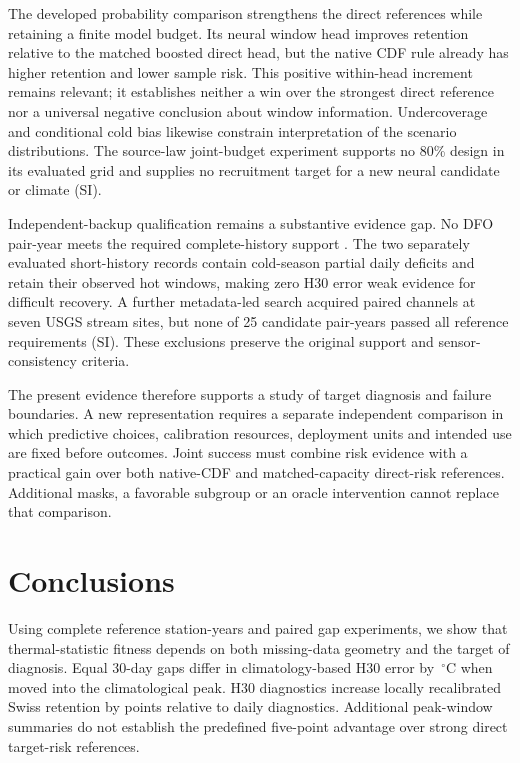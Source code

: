 The developed probability comparison strengthens the direct references while retaining a finite model budget. Its neural window head improves retention relative to the matched boosted direct head, but the native CDF rule already has higher retention and lower sample risk. This positive within-head increment remains relevant; it establishes neither a win over the strongest direct reference nor a universal negative conclusion about window information. Undercoverage and conditional cold bias likewise constrain interpretation of the scenario distributions. The source-law joint-budget experiment supports no 80\% design in its evaluated grid and supplies no recruitment target for a new neural candidate or climate (SI).

Independent-backup qualification remains a substantive evidence gap. No DFO pair-year meets the required complete-history support \cite{dfo2024}. The two separately evaluated short-history records contain cold-season partial daily deficits and retain their observed hot windows, making zero H30 error weak evidence for difficult recovery. A further metadata-led search acquired paired channels at seven USGS stream sites, but none of 25 candidate pair-years passed all reference requirements (SI). These exclusions preserve the original support and sensor-consistency criteria.

The present evidence therefore supports a study of target diagnosis and failure boundaries. A new representation requires a separate independent comparison in which predictive choices, calibration resources, deployment units and intended use are fixed before outcomes. Joint success must combine risk evidence with a practical gain over both native-CDF and matched-capacity direct-risk references. Additional masks, a favorable subgroup or an oracle intervention cannot replace that comparison.

\section{Conclusions}

Using \RSourceYears{} complete reference station-years and paired gap experiments, we show that thermal-statistic fitness depends on both missing-data geometry and the target of diagnosis. Equal 30-day gaps differ in climatology-based H30 error by \RPosition{}\,$^{\circ}$C when moved into the climatological peak. H30 diagnostics increase locally recalibrated Swiss retention by \RTestRetTargetDailyGain{} points relative to daily diagnostics. Additional peak-window summaries do not establish the predefined five-point advantage over strong direct target-risk references.

